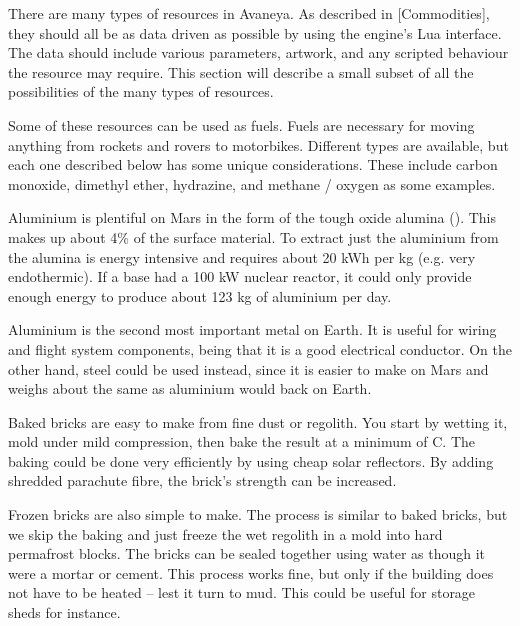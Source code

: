 

There are many types of resources in Avaneya. As described in [Commodities], they should all be as data driven as possible by using the engine’s Lua interface. The data should include various parameters, artwork, and any scripted behaviour the resource may require. This section will describe a small subset of all the possibilities of the many types of resources.

Some of these resources can be used as fuels. Fuels are necessary for moving anything from rockets and rovers to motorbikes. Different types are available, but each one described below has some unique considerations. These include carbon monoxide, dimethyl ether, hydrazine, and methane / oxygen as some examples.

Aluminium is plentiful on Mars in the form of the tough oxide alumina (). This makes up about 4\% of the surface material. To extract just the aluminium from the alumina is energy intensive and requires about 20 kWh per kg (e.g. very endothermic). If a base had a 100 kW nuclear reactor, it could only provide enough energy to produce about 123 kg of aluminium per day.

Aluminium is the second most important metal on Earth. It is useful for wiring and flight system components, being that it is a good electrical conductor. On the other hand, steel could be used instead, since it is easier to make on Mars and weighs about the same as aluminium would back on Earth.

Baked bricks are easy to make from fine dust or regolith. You start by wetting it, mold under mild compression, then bake the result at a minimum of C. The baking could be done very efficiently by using cheap solar reflectors. By adding shredded parachute fibre, the brick's strength can be increased.

Frozen bricks are also simple to make. The process is similar to baked bricks, but we skip the baking and just freeze the wet regolith in a mold into hard permafrost blocks. The bricks can be sealed together using water as though it were a mortar or cement. This process works fine, but only if the building does not have to be heated -- lest it turn to mud. This could be useful for storage sheds for instance.

